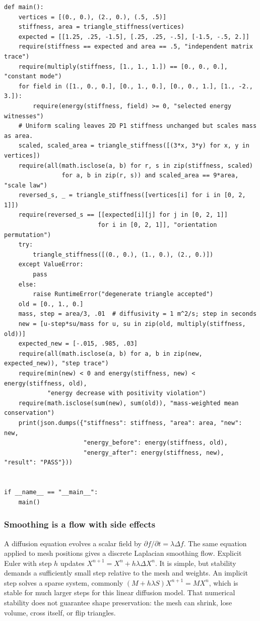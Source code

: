 \begin{verbatim}
def main():
    vertices = [(0., 0.), (2., 0.), (.5, .5)]
    stiffness, area = triangle_stiffness(vertices)
    expected = [[1.25, .25, -1.5], [.25, .25, -.5], [-1.5, -.5, 2.]]
    require(stiffness == expected and area == .5, "independent matrix trace")
    require(multiply(stiffness, [1., 1., 1.]) == [0., 0., 0.], "constant mode")
    for field in ([1., 0., 0.], [0., 1., 0.], [0., 0., 1.], [1., -2., 3.]):
        require(energy(stiffness, field) >= 0, "selected energy witnesses")
    # Uniform scaling leaves 2D P1 stiffness unchanged but scales mass as area.
    scaled, scaled_area = triangle_stiffness([(3*x, 3*y) for x, y in vertices])
    require(all(math.isclose(a, b) for r, s in zip(stiffness, scaled)
                for a, b in zip(r, s)) and scaled_area == 9*area, "scale law")
    reversed_s, _ = triangle_stiffness([vertices[i] for i in [0, 2, 1]])
    require(reversed_s == [[expected[i][j] for j in [0, 2, 1]]
                          for i in [0, 2, 1]], "orientation permutation")
    try:
        triangle_stiffness([(0., 0.), (1., 0.), (2., 0.)])
    except ValueError:
        pass
    else:
        raise RuntimeError("degenerate triangle accepted")
    old = [0., 1., 0.]
    mass, step = area/3, .01  # diffusivity = 1 m^2/s; step in seconds
    new = [u-step*su/mass for u, su in zip(old, multiply(stiffness, old))]
    expected_new = [-.015, .985, .03]
    require(all(math.isclose(a, b) for a, b in zip(new, expected_new)), "step trace")
    require(min(new) < 0 and energy(stiffness, new) < energy(stiffness, old),
            "energy decrease with positivity violation")
    require(math.isclose(sum(new), sum(old)), "mass-weighted mean conservation")
    print(json.dumps({"stiffness": stiffness, "area": area, "new": new,
                      "energy_before": energy(stiffness, old),
                      "energy_after": energy(stiffness, new), "result": "PASS"}))


if __name__ == "__main__":
    main()
\end{verbatim}

\subsubsection{Smoothing is a flow with side effects}\label{03-visual-computing-i-ch002-smoothing-is-a-flow-with-side-effects}

A diffusion equation evolves a scalar field by \(\partial f/\partial t=\lambda\Delta f\). The same equation applied to mesh positions gives a discrete Laplacian smoothing flow. Explicit Euler with step \(h\) updates \(X^{n+1}=X^n+h\lambda\Delta X^n\). It is simple, but stability demands a sufficiently small step relative to the mesh and weights. An implicit step solves a sparse system, commonly \((M+h\lambda S)X^{n+1}=MX^n\), which is stable for much larger steps for this linear diffusion model. That numerical stability does not guarantee shape preservation: the mesh can shrink, lose volume, cross itself, or flip triangles.

